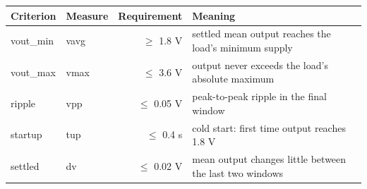 \begin{tabular}{llrp{5.2cm}}
\toprule
Criterion & Measure & Requirement & Meaning \\
\midrule
vout\_min & vavg & $\geq$ 1.8 V & settled mean output reaches the load's minimum supply \\
vout\_max & vmax & $\leq$ 3.6 V & output never exceeds the load's absolute maximum \\
ripple & vpp & $\leq$ 0.05 V & peak-to-peak ripple in the final window \\
startup & tup & $\leq$ 0.4 s & cold start: first time output reaches 1.8 V \\
settled & dv & $\leq$ 0.02 V & mean output changes little between the last two windows \\
\bottomrule
\end{tabular}
